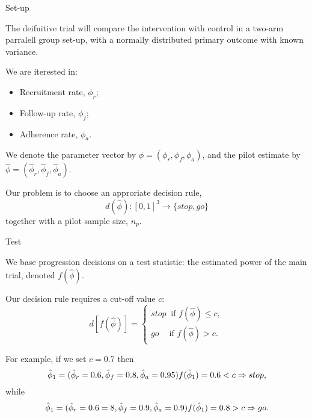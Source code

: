 \documentclass[
  ignorenonframetext,
]{beamer}
\providecommand{\tightlist}{%
  \setlength{\itemsep}{0pt}\setlength{\parskip}{0pt}}
\begin{document}
\begin{frame}{Set-up}
\protect\hypertarget{set-up}{}

The deifnitive trial will compare the intervention with control in a
two-arm parralell group set-up, with a normally distributed primary
outcome with known variance.

We are iterested in:

\begin{itemize}
\tightlist
\item
  Recruitment rate, \(\phi_r\);
\item
  Follow-up rate, \(\phi_f\);
\item
  Adherence rate, \(\phi_a\).
\end{itemize}

We denote the parameter vector by \(\phi = (\phi_r, \phi_f, \phi_a)\),
and the pilot estimate by
\(\hat{\phi} = (\hat{\phi}_r, \hat{\phi}_f, \hat{\phi}_a)\).

Our problem is to choose an approriate decision rule, \[
d(\hat{\phi}): [0,1]^3 \rightarrow \{stop, go\}
\] together with a pilot sample size, \(n_p\).

\end{frame}

\begin{frame}{Test}
\protect\hypertarget{test}{}

We base progression decisions on a test statistic: the estimated power
of the main trial, denoted \(f(\hat{\phi})\).

Our decision rule requires a cut-off value \(c\): \[
d[f(\hat{\phi})] = 
\begin{cases}
stop ~\text{ if } f(\hat{\phi}) \leq c, \\
go ~~~~\text{ if } f(\hat{\phi}) > c.
\end{cases}
\]

For example, if we set \(c = 0.7\) then \[
\hat{\phi}_1 = (\hat{\phi}_r = 0.6, \hat{\phi}_f = 0.8, \hat{\phi}_a = 0.95) \\
f(\hat{\phi}_1) = 0.6 < c \Rightarrow stop,
\] while \[
\hat{\phi}_1 = (\hat{\phi}_r = 0.6=8, \hat{\phi}_f = 0.9, \hat{\phi}_a = 0.9) \\
f(\hat{\phi}_1) = 0.8 > c \Rightarrow go.
\]

\end{frame}
\end{document}
